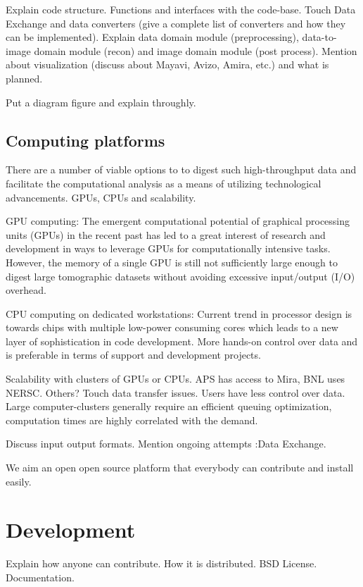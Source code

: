 \documentclass[pdf]{iucr}              %
\begin{document}
Explain code structure. Functions and interfaces with the code-base. Touch Data Exchange and data converters (give a complete list of converters and how they can be implemented). Explain data domain module (preprocessing), data-to-image domain module (recon) and image domain module (post process). Mention about visualization (discuss about Mayavi, Avizo, Amira, etc.) and what is planned.

Put a diagram figure and explain throughly.

\subsection{Computing platforms}

There are a number of viable options to to digest such high-throughput data and facilitate the computational analysis as a means of utilizing technological advancements. GPUs, CPUs and scalability.

GPU computing: The emergent computational potential of graphical processing units (GPUs) in the recent past has led to a great interest of research and development in ways to leverage GPUs for computationally intensive tasks. However, the memory of a single GPU is still not sufficiently large enough to digest large tomographic datasets without avoiding excessive input/output (I/O) overhead. 

CPU computing on dedicated workstations: Current trend in processor design is towards chips with multiple low-power consuming cores which leads to a new layer of sophistication in code development. More hands-on control over data and is preferable in terms of support and development projects.

Scalability with clusters of GPUs or CPUs. APS has  access to Mira, BNL uses NERSC. Others? Touch data transfer issues. Users have less control over data. Large computer-clusters generally require an efficient queuing optimization, computation times are highly correlated with the demand.  

Discuss input output formats. Mention ongoing attempts :Data Exchange.

We aim an open open source platform that everybody can contribute and install easily.

\section{Development}

Explain how anyone can contribute. How it is distributed. BSD License. Documentation.
\end{document}
